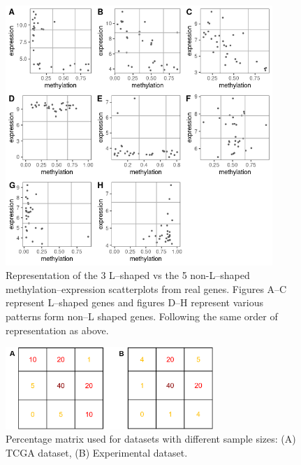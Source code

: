 \documentclass[10pt,letterpaper]{article}
\begin{document}
\begin{figure}
\hypertarget{id}{%
\centering
\includegraphics[width=0.9\textwidth,height=0.5\textheight]{figures/Figure4.png}
\caption{Representation of the 3 L--shaped vs the 5 non-L--shaped
methylation--expression scatterplots from real genes. Figures A--C
represent L--shaped genes and figures D--H represent various patterns
form non--L shaped genes. Following the same order of representation as
above.}\label{id}
}
\end{figure}

\begin{figure}
\hypertarget{id}{%
\centering
\includegraphics[width=0.7\textwidth,height=0.2\textheight]{figures/Figure5.png}
\caption{Percentage matrix used for datasets with different sample
sizes: (A) TCGA dataset, (B) Experimental dataset.}\label{id}
}
\end{figure}
\end{document}
